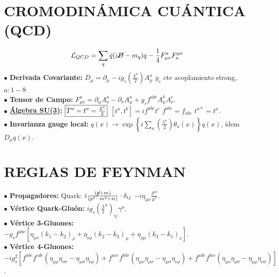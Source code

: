 \section{CROMODINÁMICA CUÁNTICA (QCD)}
\vspace{-3pt}
$$\mathcal{L}_{QCD} = \sum_{q} \bar{q}(i\cancel{D}-m_q)q - \frac{1}{4}F_{\mu\nu}^a F_a^{\mu\nu}$$
$\bullet$ \textbf{Derivada Covariante:} $D_\mu = \partial_\mu - ig_s \left( \frac{\lambda ^a}{2}\right) A_\mu ^a$ \quad $g_s$ cte acoplamiento strong, \;  $a: 1-8$ \\
$\bullet$ \textbf{Tensor de Campo:} $F_{\mu\nu}^a = \partial_\mu A_\nu^a - \partial_\nu A_\mu^a + g_s f^{abc} A_\mu^b A_\nu^c$. \\
$\bullet$ \textbf{\hyperlink{su3}{Álgebra SU(3)}:}
$\setlength{\fboxsep}{1.5pt} \boxed{T^a=t^a = \tfrac{\lambda^a}{2}}$ \quad $[t^a, t^b] = i f^{abc} t^c$ \quad $f^{abc} = f_{abc}$ \quad $t^{a*} = t^a$.
\\
$\bullet$ \textbf{Invarianza gauge local:} $q(x) \rightarrow \exp{\left\{i\sum_a(\frac{\lambda^a}{2}) \theta_a(x)\right\}} q (x)$, ídem $D_\mu q(x)$.
\vspace{-5pt}
\begin{center}
\end{center}
\vspace{-5pt}
\section{REGLAS DE FEYNMAN}
$\bullet$ \textbf{Propagadores:} Quark: $i\frac{(\cancel{p}+m)}{(p^2-m^2+i\epsilon)} \cdot \delta_{ij}$ \quad  {} $-i\eta_{\mu\nu}\frac{\delta^{ab}}{k^2}$. \\
$\bullet$ \textbf{Vértice Quark-Gluón:} $ig_s  (\frac{\lambda}{2}^a)_{ij}\gamma^\mu$. \\
$\bullet$ \textbf{Vértice 3-Gluones:} $-g_s f^{abc} [\eta_{\mu\nu}(k_1-k_2)_\rho + \eta_{\nu\rho}(k_2-k_3)_\mu + \eta_{\rho\mu}(k_3-k_1)_\nu]$. \\
$\bullet$ \textbf{Vértice 4-Gluones:} $-ig_s^2 [f^{abe}f^{cde}(\eta_{\mu\rho}\eta_{\nu\sigma}-\eta_{\mu\sigma}\eta_{\nu\rho}) + f^{ace}f^{bde}(\eta_{\mu\nu}\eta_{\rho\sigma}-\eta_{\mu\sigma}\eta_{\nu\rho}) + f^{ade}f^{bce}(\eta_{\mu\nu}\eta_{\rho\sigma}-\eta_{\mu\rho}\eta_{\nu\sigma})]$.

